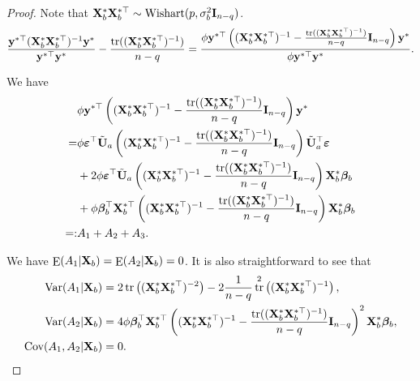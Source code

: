 \documentclass[11pt]{article}
\DeclareMathOperator{\mytr}{tr}
\DeclareMathOperator{\myE}{E}
\DeclareMathOperator{\myVar}{Var}
\newcommand{\By}{\mathbf{y}}    \newcommand{\Bz}{\mathbf{z}}
\newcommand{\bfsym}[1]{\ensuremath{\boldsymbol{#1}}}
\def\bbeta{\bfsym \beta}
\theoremstyle{plain}
\theoremstyle{definition}
\theoremstyle{remark}
\begin{document}
\begin{proof}
    Note that $\mathbf{X}_b^* \mathbf{X}_b^{*\top} \sim \text{Wishart}(p,\sigma_b^2 \mathbf{I}_{n-q})$.
    \begin{equation*}
        \frac{\By^{*\top} (\BX_b^* \BX_b^{*\top})^{-1} \By^*}{\By^{*\top} \By^*} -\frac{\mytr ((\BX_b^* \BX_b^{*\top})^{-1})}{n-q}
        =
        \frac{\phi\By^{*\top}\left( (\BX_b^* \BX_b^{*\top})^{-1} 
                -\frac{\mytr ( (\BX_b^* \BX_b^{*\top})^{-1})}{n-q} 
                \BI_{n-q}
        \right) \By^*}{\phi\By^{*\top} \By^*}.
    \end{equation*}

We have
\begin{equation*}
    \begin{split}
&
\phi\By^{*\top}\left( (\BX_b^* \BX_b^{*\top})^{-1} 
                -\frac{\mytr ( (\BX_b^* \BX_b^{*\top})^{-1})}{n-q} 
                \BI_{n-q}
        \right) \By^*
        \\
        =&
\phi
\bepsilon^{\top} \tilde \BU_a \left( (\BX_b^* \BX_b^{*\top})^{-1} 
                -\frac{\mytr ( (\BX_b^* \BX_b^{*\top})^{-1})}{n-q} 
                \BI_{n-q}
        \right) \tilde \BU_a^\top \bepsilon
        \\
        &+
2\phi\bepsilon^{\top} \tilde \BU_a \left( (\BX_b^* \BX_b^{*\top})^{-1} 
                -\frac{\mytr ( (\BX_b^* \BX_b^{*\top})^{-1})}{n-q} 
                \BI_{n-q}
            \right)  \BX_b^* \bbeta_b
        \\
        &+
\phi
 \bbeta_b^\top
 \BX_b^{*\top}
\left( (\BX_b^* \BX_b^{*\top})^{-1} 
                -\frac{\mytr ( (\BX_b^* \BX_b^{*\top})^{-1})}{n-q} 
                \BI_{n-q}
            \right)  \BX_b^* \bbeta_b
            \\
            =:& A_1 +A_2 +A_3.
    \end{split}
\end{equation*}

We have $\myE (A_1|\BX_b)=\myE (A_2|\BX_b)=0$.
It is also straightforward to see that 
\begin{equation*}
    \begin{split}
        \myVar (A_1|\BX_b)
        &= 2\mytr  \left( (\BX_b^* \BX_b^{*\top})^{-2} \right)
                -2\frac{1}{n-q} \mytr^2 \left( (\BX_b^* \BX_b^{*\top})^{-1}\right)
                ,
                \\
                \myVar (A_2|\BX_b)&= 
                4 \phi \bbeta_b^\top \BX_b^{*\top}
                \left( (\BX_b^* \BX_b^{*\top})^{-1} 
                -\frac{\mytr ( (\BX_b^* \BX_b^{*\top})^{-1})}{n-q} 
                \BI_{n-q}
            \right)^2  \BX_b^* \bbeta_b
            ,\\
            \text{Cov} (A_1,A_2|\BX_b)&=0.
    \end{split}
\end{equation*}


\end{proof}
\end{document}

